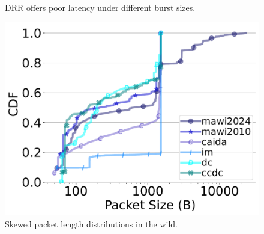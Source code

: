 \begin{figure}[t]
\begin{minipage}[t]{0.32\textwidth}
    \caption{\small{DRR offers poor latency under different burst sizes.}}
	\label{fig:drr-burst-latency}
  \end{minipage}
   \begin{minipage}[t]{0.32\textwidth}
     		\centering\includegraphics[width=1\linewidth]{figs/aggregate_ipg_pktsize_cdf.pdf}
         \vspace{-7mm}
		\caption{\small{Skewed packet length distributions in the wild.}}
            \label{fig:packets-wild}
  \end{minipage}
  \vspace{-0.2cm}
\end{figure}
